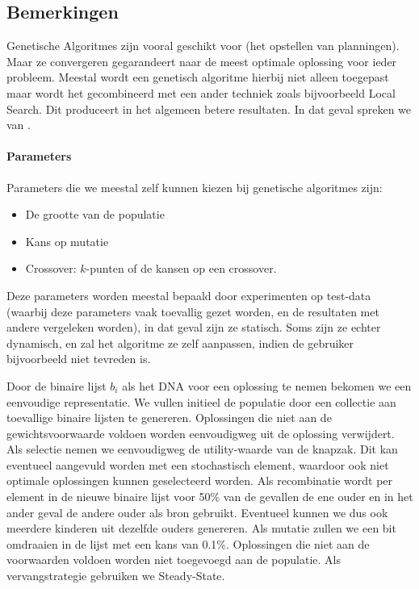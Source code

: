 \subsection{Bemerkingen}Genetische Algoritmes zijn vooral geschikt voor  (het opstellen van planningen). Maar ze convergeren gegarandeert naar de meest optimale oplossing voor ieder probleem. Meestal wordt een genetisch algoritme hierbij niet alleen toegepast maar wordt het gecombineerd met een ander techniek zoals bijvoorbeeld Local Search. Dit produceert in het algemeen betere resultaten. In dat geval spreken we van .
\paragraph{Parameters}Parameters die we meestal zelf kunnen kiezen bij genetische algoritmes zijn:
\begin{itemize}
 \item De grootte van de populatie
 \item Kans op mutatie
 \item Crossover: $k$-punten of de kansen op een crossover.
\end{itemize}
Deze parameters worden meestal bepaald door experimenten op test-data (waarbij deze parameters vaak toevallig gezet worden, en de resultaten met andere vergeleken worden), in dat geval zijn ze statisch. Soms zijn ze echter dynamisch, en zal het algoritme ze zelf aanpassen, indien de gebruiker bijvoorbeeld niet tevreden is.
\begin{leftbar}
Door de binaire lijst $b_i$ als het DNA voor een oplossing te nemen bekomen we een eenvoudige representatie. We vullen initieel de populatie door een collectie aan toevallige binaire lijsten te genereren. Oplossingen die niet aan de gewichtsvoorwaarde voldoen worden eenvoudigweg uit de oplossing verwijdert. Als selectie nemen we eenvoudigweg de utility-waarde van de knapzak. Dit kan eventueel aangevuld worden met een stochastisch element, waardoor ook niet optimale oplossingen kunnen geselecteerd worden. Als recombinatie wordt per element in de nieuwe binaire lijst voor 50\% van de gevallen de ene ouder en in het ander geval de andere ouder als bron gebruikt. Eventueel kunnen we dus ook meerdere kinderen uit dezelfde ouders genereren. Als mutatie zullen we een bit omdraaien in de lijst met een kans van 0.1\%. Oplossingen die niet aan de voorwaarden voldoen worden niet toegevoegd aan de populatie. Als vervangstrategie gebruiken we Steady-State.
\end{leftbar}
